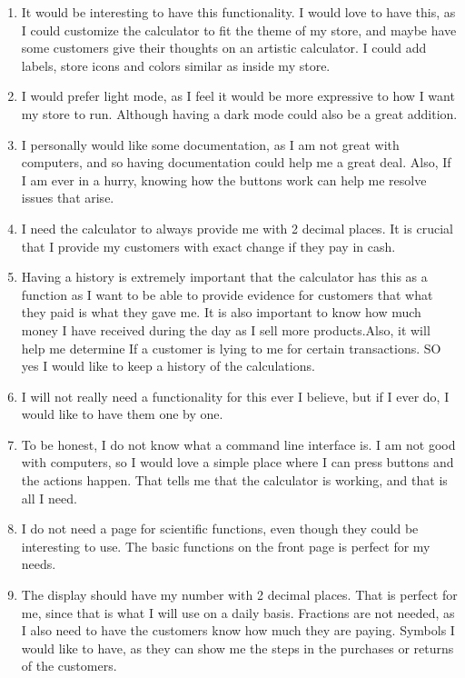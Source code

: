 \begin{itemize}
\begin{enumerate}
                        \item It would be interesting to have this functionality. I would love to have this, as I could customize the calculator to fit the theme of my store, and maybe have some customers give their thoughts on an artistic calculator. I could add labels, store icons and colors similar as inside my store.
                        \item I would prefer light mode, as I feel it would be more expressive to how I want my store to run. Although having a dark mode could also be a great addition.
                        \item I personally would like some documentation, as I am not great with computers, and so having documentation could help me a great deal. Also, If I am ever in a hurry, knowing how the buttons work can help me resolve issues that arise.
                        \item I need the calculator to always provide me with 2 decimal places. It is crucial that I provide my customers with exact change if they pay in cash.
                        \item Having a history is extremely important that the calculator has this as a function as I want to be able to provide evidence for customers that what they paid is what they gave me. It is also important to know how much money I have received during the day as I sell more products.Also, it will help me determine If a customer is lying to me for certain transactions. SO yes I would like to keep a history of the calculations.
                        \item I will not really need a functionality for this ever I believe, but if I ever do, I would like to have them one by one.
                        \item To be honest, I do not know what a command line interface is. I am not good with computers, so I would love a simple place where I can press buttons and the actions happen. That tells me that the calculator is working, and that is all I need.
                        \item I do not need a page for scientific functions, even though they could be interesting to use. The basic functions on the front page is perfect for my needs.
                        \item The display should have my number with 2 decimal places. That is perfect for me, since that is what I will use on a daily basis. Fractions are not needed, as I also need to have the customers know how much they are paying. Symbols I would like to have, as they can show me the steps in the purchases or returns of the customers.

\end{enumerate}
\end{itemize}
